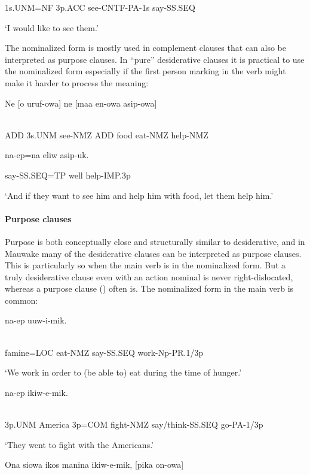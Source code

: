 1s.UNM=NF  3p.ACC  see-CNTF-PA-1s  say-SS.SEQ

`I would like to see them.'

The nominalized form is mostly used in complement clauses that can also be interpreted as purpose clauses. In ``pure'' desiderative clauses it is practical to use the nominalized form especially if the first person marking in the verb might make it harder to process the meaning:

\ea%
\label{ex:x1610}
\gll Ne  [o  uruf-owa]  ne  [maa  en-owa  asip-owa] \\
      \\
\glt
\z

ADD  3s.UNM  see-NMZ  ADD  food  eat-NMZ  help-NMZ

na-ep=na  eliw  asip-uk.

say-SS.SEQ=TP  well  help-IMP.3p

`And if they want to see him and help him with food, let them help him.'

\paragraph[Purpose clauses]{Purpose clauses}
\hypertarget{RefHeading23501935131865}{}
Purpose is both conceptually close and structurally similar to desiderative, and in Mauwake many of the desiderative clauses can be interpreted as purpose clauses. This is particularly so when the main verb is in the nominalized form. But a truly desiderative clause even with an action nominal is never right-dislocated, whereas a purpose clause () often is. The nominalized form in the main verb is common:

\ea%
\label{ex:x371}
\gll [Weniwa=pa  en-owa]  na-ep  uuw-i-mik. \\
      \\
\glt
\z

famine=LOC  eat-NMZ  say-SS.SEQ  work-Np-PR.1/3p

 `We work in order to (be able to) eat during the time of hunger.'

\ea%
\label{ex:x345}
\gll [Wi  Amerika  wiam=iya  irak-owa]  na-ep  ikiw-e-mik. \\
      \\
\glt
\z

3p.UNM  America  3p=COM  fight-NMZ  say/think-SS.SEQ  go-PA-1/3p

`They went to fight with the Americans.'

\ea%
\label{ex:x372}
\gll Ona  siowa  ikos  manina  ikiw-e-mik,  [pika  on-owa] \\
      \\
\glt
\z

